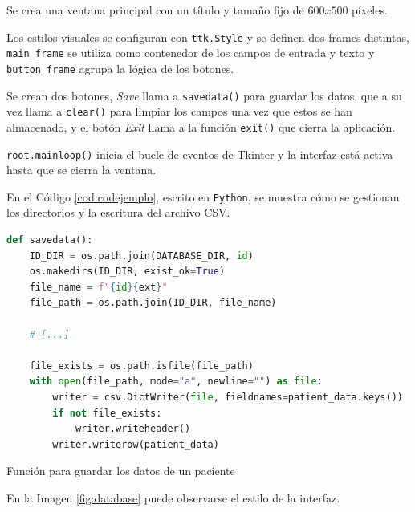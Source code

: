 Se crea una ventana principal con un título y tamaño fijo de $600x500$ píxeles.

Los estilos visuales se configuran con \verb|ttk.Style| y se definen dos frames distintas, \verb|main_frame| se utiliza como contenedor de los campos de entrada y texto y \verb|button_frame| agrupa la lógica de los botones.

Se crean dos botones, \textit{Save} llama a \verb|savedata()| para guardar los datos, que a su vez llama a \verb|clear()| para limpiar los campos una vez que estos se han almacenado, y el botón \textit{Exit} llama a la función \verb|exit()| que cierra la aplicación.

\verb|root.mainloop()| inicia el bucle de eventos de Tkinter y la interfaz está activa hasta que se cierra la ventana.

En el Código \ref{cod:codejemplo}, escrito en \texttt{Python}, se muestra cómo se gestionan los directorios y la escritura del archivo CSV.

\begin{code}[h]
\begin{lstlisting}[language=Python]
def savedata():
    ID_DIR = os.path.join(DATABASE_DIR, id)
    os.makedirs(ID_DIR, exist_ok=True)
    file_name = f"{id}{ext}"
    file_path = os.path.join(ID_DIR, file_name)

    # [...]

    file_exists = os.path.isfile(file_path)
    with open(file_path, mode="a", newline="") as file:
        writer = csv.DictWriter(file, fieldnames=patient_data.keys())
        if not file_exists:
            writer.writeheader()
        writer.writerow(patient_data)
\end{lstlisting}
\caption[Función para guardar los datos de un paciente]{Función para guardar los datos de un paciente}
\label{cod:codejemplo}
\end{code}

En la Imagen \ref{fig:database} puede observarse el estilo de la interfaz.

